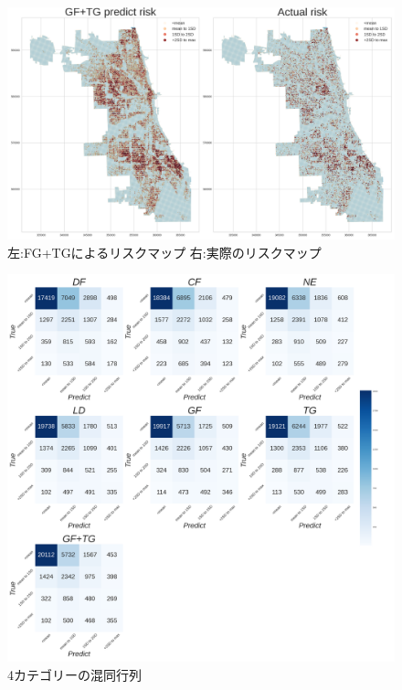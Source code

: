 \begin{figure}
  \centering %
  \includegraphics[scale=0.25]{./add-crime-timeseries-fig/GF+TG_riskmap.png}
  \caption{左:FG+TGによるリスクマップ 右:実際のリスクマップ}
  \label{fig:add-crime-timeseries-gf-tg-risk}
\end{figure}
\begin{figure}
  \centering %
  \includegraphics[scale=0.16]{./add-crime-timeseries-fig/crime_timeseries_four_cm.png}
  \caption{4カテゴリーの混同行列}
  \label{fig:add-crime-timeseries-4cm}
\end{figure}

